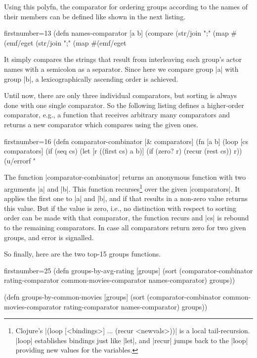 \documentclass[a4paper]{article}
\newcommand{\code}{\clojureinline}
\begin{document}
Using this polyfn, the comparator for ordering groups according to the names of
their members can be defined like shown in the next listing.

\begin{clojurecode*}{firstnumber=13}
(defn names-comparator [a b]
  (compare (str/join ";" (map #(emf/eget %
           (str/join ";" (map #(emf/eget %
\end{clojurecode*}

It simply compares the strings that result from interleaving each group's actor
names with a semicolon as a separator.  Since here we compare group \code|a|
with group \code|b|, a lexicographically ascending order is achieved.

Until now, there are only three individual comparators, but sorting is always
done with one single comparator.  So the following listing defines a
higher-order comparator, e.g., a function that receives arbitrary many
comparators and returns a new comparator which compares using the given ones.

\begin{clojurecode*}{firstnumber=16}
(defn comparator-combinator [& comparators]
  (fn [a b]
    (loop [cs comparators]
      (if (seq cs)
        (let [r ((first cs) a b)]
          (if (zero? r)
            (recur (rest cs))
            r))
        (u/errorf "%
\end{clojurecode*}

The function \code|comparator-combinator| returns an anonymous function with
two arguments \code|a| and \code|b|.  This function recurses\footnote{Clojure's
  \code|(loop [<bindings>] ... (recur <newvals>))| is a local tail-recursion.
  \code|loop| establishes bindings just like \code|let|, and \code|recur| jumps
  back to the \code|loop| providing new values for the variables.} over the
given \code|comparators|.  It applies the first one to \code|a| and \code|b|,
and if that results in a non-zero value returns this value.  But if the value
is zero, i.e., no distinction with respect to sorting order can be made with
that comparator, the function recurs and \code|cs| is rebound to the remaining
comparators.  In case all comparators return zero for two given groups, and
error is signalled.

So finally, here are the two top-15 groups functions.

\begin{clojurecode*}{firstnumber=25}
(defn groups-by-avg-rating [groups]
  (sort (comparator-combinator rating-comparator common-movies-comparator names-comparator)
        groups))

(defn groups-by-common-movies [groups]
  (sort (comparator-combinator common-movies-comparator rating-comparator names-comparator)
        groups))
\end{clojurecode*}
\end{document}
